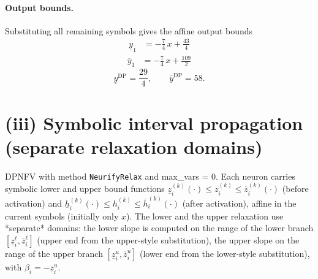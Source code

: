 \documentclass[11pt]{article}
\begin{document}
\paragraph{Output bounds.}
Substituting all remaining symbols gives the affine output bounds
\begin{align*}
\underline{y}_{1} &= -\frac{7}{4}\,x + \frac{43}{4}
\end{align*}
\begin{align*}
\overline{y}_{1} &= -\frac{7}{4}\,x + \frac{109}{2}
\end{align*}
\begin{equation*}
\underline{y}^{\text{DP}} = \frac{29}{4}, \qquad \overline{y}^{\text{DP}} = 58.
\end{equation*}

\section{(iii) Symbolic interval propagation (separate relaxation domains)}
DPNFV with method \texttt{NeurifyRelax} and max\_vars = 0. Each neuron carries symbolic lower and upper bound functions
$\underline{z}^{(k)}_i(\cdot) \le z^{(k)}_i \le \overline{z}^{(k)}_i(\cdot)$ (before activation)
and $\underline{h}^{(k)}_i(\cdot) \le h^{(k)}_i \le \overline{h}^{(k)}_i(\cdot)$ (after activation),
affine in the current symbols (initially only $x$).
The lower and the upper relaxation use *separate* domains:
the lower slope is computed on the range of the lower branch
$[\underline{z}^{\ell}_i, \overline{z}^{\ell}_i]$ (upper end from the upper-style substitution),
the upper slope on the range of the upper branch
$[\underline{z}^{u}_i, \overline{z}^{u}_i]$ (lower end from the lower-style substitution),
with $\beta_i = -\underline{z}^{u}_i$.
\end{document}
